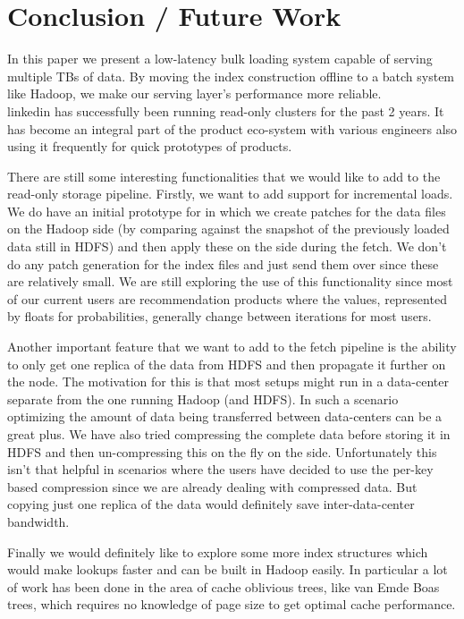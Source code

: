 \section{Conclusion / Future Work}
\label{sec:conclusion}

In this paper we present a low-latency bulk loading system capable of serving multiple TBs of data. By moving the index construction offline to a batch system like Hadoop, we make our serving layer's performance more reliable. \\linkedin{}{} has successfully been running read-only \projectname{} clusters for the past 2 years. It has become an integral part of the product eco-system with various engineers also using it frequently for quick prototypes of products. 

There are still some interesting functionalities that we would like to add to the read-only storage pipeline. Firstly, we want to add support for incremental loads. We do have an initial prototype for in which we create patches for the data files on the Hadoop side (by comparing against the snapshot of the previously loaded data still in HDFS) and then apply these on the \projectname{} side during the fetch. We don't do any patch generation for the index files and just send them over since these are relatively small. We are still exploring the use of this functionality since most of our current users are recommendation products where the values, represented by floats for probabilities, generally change between iterations for most users. 

Another important feature that we want to add to the fetch pipeline is the ability to only get one replica of the data from HDFS and then propagate it further on the \projectname{} node. The motivation for this is that most \projectname{} setups might run in a data-center separate from the one running Hadoop (and HDFS). In such a scenario optimizing the amount of data being transferred between data-centers can be a great plus. We have also tried compressing the complete data before storing it in HDFS and then un-compressing this on the fly on the \projectname{} side. Unfortunately this isn't that helpful in scenarios where the users have decided to use the per-key based compression since we are already dealing with compressed data. But copying just one replica of the data would definitely save inter-data-center bandwidth. 

Finally we would definitely like to explore some more index structures which would make lookups faster and can be built in Hadoop easily. In particular a lot of work has been done in the area of cache oblivious trees, like van Emde Boas trees, which requires no knowledge of page size to get optimal cache performance. 


